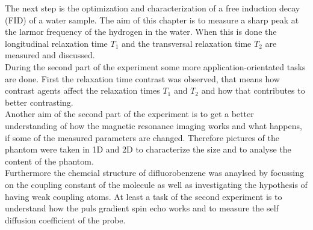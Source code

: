 The next step is the optimization and characterization of a free induction decay (FID) of a water sample.
The aim of this chapter is to measure a sharp peak at the larmor frequency of the hydrogen in the water.
When this is done the longitudinal relaxation time $T_1$ and the transversal relaxation time $T_2$ are measured and discussed.\\
During the second part of the experiment some more application-orientated tasks are done.
First the relaxation time contrast was observed, that means how contrast agents affect the relaxation times $T_1$ and $T_2$ and how that contributes to better contrasting.\\
Another aim of the second part of the experiment is to get a better understanding of how
the magnetic resonance imaging works and what happens, if some of the measured parameters are changed. Therefore pictures of the phantom were taken in 1D and 2D to characterize the size and to analyse the content of the phantom.\\
Furthermore the chemcial structure of difluorobenzene was anaylsed by focussing on the coupling constant of the molecule as well as investigating the hypothesis of having weak coupling atoms.
At least a task of the second experiment is to understand how the puls gradient spin echo works and to measure the self diffusion coefficient of the probe.
